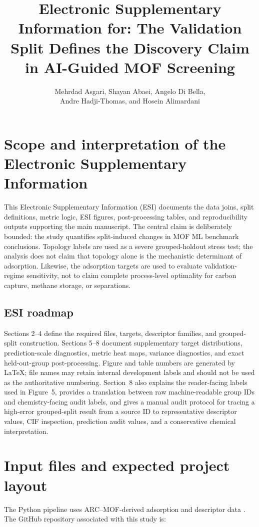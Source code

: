 \documentclass[11pt,a4paper]{article}
\title{\textbf{Electronic Supplementary Information for: The Validation Split Defines the Discovery Claim in AI-Guided MOF Screening}}
\author{Mehrdad Asgari, Shayan Abaei, Angelo Di Bella,\\ Andre Hadji-Thomas, and Hosein Alimardani}
\date{}
\begin{document}
\maketitle
\begingroup
\sloppy
\tableofcontents
\endgroup
\clearpage
\section[Scope and interpretation]{Scope and interpretation of the Electronic Supplementary Information}
This Electronic Supplementary Information (ESI) documents the data joins, split definitions, metric logic,
ESI figures, post-processing tables, and reproducibility outputs supporting the main manuscript.
The central claim is deliberately bounded: the study quantifies split-induced changes in MOF ML benchmark
conclusions. Topology labels are used as a severe grouped-holdout stress test; the analysis does not claim
that topology alone is the mechanistic determinant of adsorption. Likewise, the adsorption targets are
used to evaluate validation-regime sensitivity, not to claim complete process-level optimality for carbon
capture, methane storage, or separations.


\subsection*{ESI roadmap}
 Sections 2--4 define the required files, targets, descriptor families, and grouped-split construction. Sections 5--8 document supplementary target distributions, prediction-scale diagnostics, metric heat maps, variance diagnostics, and exact held-out-group post-processing. Figure and table numbers are generated by LaTeX; file names may retain internal development labels and should not be used as the authoritative numbering.
Section~8 also explains the reader-facing labels used in Figure~5, provides a translation between raw machine-readable group IDs and chemistry-facing audit labels, and gives a manual audit protocol for tracing a high-error grouped-split result from a source ID to representative descriptor values, CIF inspection, prediction audit values, and a conservative chemical interpretation.


\section{Input files and expected project layout}

The Python pipeline uses ARC--MOF-derived adsorption and descriptor data \citep{Burner2023ARCMOF}. The GitHub repository associated with this study is:
\end{document}
